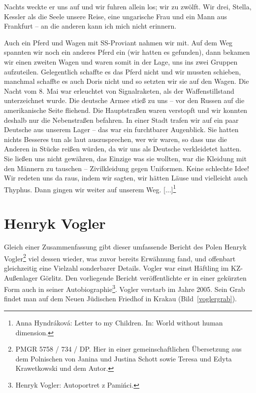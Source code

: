 \documentclass[a4paper,12pt,ngerman,
]{nisebook}
\begin{document}
Nachts weckte er uns auf und wir fuhren allein los; wir zu zwölft. Wir drei, Stella, Kessler als die Seele unsere Reise, eine ungarische Frau und ein Mann aus Frankfurt -- an die anderen kann ich mich nicht erinnern. 

Auch ein Pferd und Wagen mit SS-Proviant nahmen wir mit. Auf dem Weg spannten wir noch ein anderes Pferd ein (wir hatten es gefunden), dann bekamen wir einen zweiten Wagen und waren somit in der Lage, uns ins zwei Gruppen aufzuteilen. Gelegentlich schaffte es das Pferd nicht und wir mussten schieben, manchmal schaffte es auch Doris nicht und so setzten wir sie auf den Wagen. Die Nacht vom 8. Mai war erleuchtet von Signalraketen, als der Waffenstillstand unterzeichnet wurde. Die deutsche Armee stieß zu uns -- vor den Russen auf die amerikanische Seite fliehend. Die Hauptstraßen waren verstopft und wir konnten deshalb nur die Nebenstraßen befahren. In einer Stadt trafen wir auf ein paar Deutsche aus unserem Lager -- das war ein furchtbarer Augenblick. Sie hatten nichts Besseres tun als laut auszusprechen, wer wir waren, so dass uns die Anderen in Stücke reißen würden, da wir uns als Deutsche verkleidetet hatten. Sie ließen uns nicht gewähren, das Einzige was sie wollten, war die Kleidung mit den Männern zu tauschen -- Zivilkleidung gegen Uniformen. Keine schlechte Idee! Wir redeten uns da raus, indem wir sagten, wir hätten Läuse und vielleicht auch Thyphus. Dann gingen wir weiter auf unserem Weg. [...]\footnote{Anna Hyndr\'akov\'a: Letter to my Children. In: World without human dimension.}


\section*{Henryk Vogler}\label{vogler}
Gleich einer Zusammenfassung gibt dieser umfassende Bericht des Polen Henryk Vogler\footnote{PMGR 5758 / 734 / DP. Hier in einer gemeinschaftlichen Übersetzung aus dem Polnischen von Janina und Justina Schott sowie Teresa und Edyta Krawetkowski und dem Autor.} viel dessen wieder, was zuvor bereits Erwähnung fand, und offenbart gleichzeitig eine Vielzahl sonderbarer Details. Vogler war einst Häftling im KZ-Außenlager Görlitz. Den vorliegende Bericht veröffentlichte er in einer gekürzten Form auch in seiner Autobiographie\footnote{Henryk Vogler: Autoportret z Pamińci.}. Vogler verstarb im Jahre 2005. Sein Grab findet man auf dem Neuen Jüdischen Friedhof in Krakau (Bild~\ref{voglergrab}).  
\end{document}
